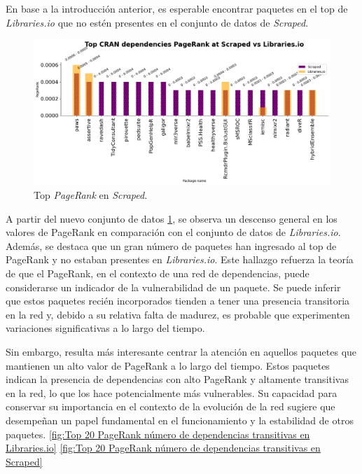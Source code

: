 En base a la introducción anterior, es esperable encontrar paquetes en el top de \textit{Libraries.io}
que no estén presentes en el conjunto de datos de \textit{Scraped}.

\begin{figure}[ht!]
    \begin{center}
        \includegraphics[width=1\textwidth]{img/cran/pr_top2.png}
        \caption{Top \textit{PageRank} en \textit{Scraped}.}
        \label{fig:cran_pr_scraped_top}
    \end{center}
\end{figure}

A partir del nuevo conjunto de datos \ref{fig:cran_pr_scraped_top}, se observa un descenso general en los
valores de PageRank en comparación con el conjunto de datos de \textit{Libraries.io}. Además, se destaca
que un gran número de paquetes han ingresado al top de PageRank y no estaban presentes en \textit{Libraries.io}.
Este hallazgo refuerza la teoría de que el PageRank, en el contexto de una red de dependencias, puede
considerarse un indicador de la vulnerabilidad de un paquete. Se puede inferir que estos paquetes recién
incorporados tienden a tener una presencia transitoria en la red y, debido a su relativa falta de madurez,
es probable que experimenten variaciones significativas a lo largo del tiempo.

Sin embargo, resulta más interesante centrar la atención en aquellos paquetes que mantienen un alto valor de
PageRank a lo largo del tiempo. Estos paquetes indican la presencia de dependencias con alto PageRank y altamente
transitivas en la red, lo que los hace potencialmente más vulnerables. Su capacidad para conservar su
importancia en el contexto de la evolución de la red sugiere que desempeñan un papel fundamental en el
funcionamiento y la estabilidad de otros paquetes. \ref{fig:Top 20 PageRank número de dependencias transitivas en Libraries.io}
\ref{fig:Top 20 PageRank número de dependencias transitivas en Scraped}

